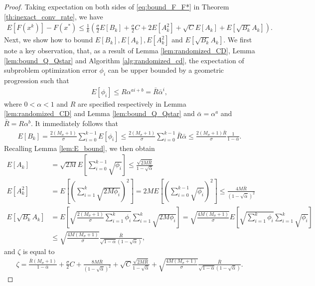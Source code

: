 \documentclass[11pt]{article}
\numberwithin{equation}{section}
\begin{document}
\begin{proof}
    Taking expectation on both sides of \eqref{eq:bound_F_F*} in Theorem \ref{th:inexact_conv_rate}, we have
    \begin{align}
    \label{eq:exp_bound}
        E[F(x^k)] - F(x^*) \leq \frac{1}{k} \left( \frac{\sigma}{2} E[B_k] +\frac{\sigma}{2} C + 2E[A_k^2] + \sqrt{C} E[A_k] + E[\sqrt{B_k} A_k] \right).
    \end{align}
    Next, we show how to bound $E[B_k], E[A_k], E[A_k^2]$ and $E[\sqrt{B_k} A_k]$. We first note a key observation, that, as a result of Lemma \ref{lem:randomized_CD}, Lemma \ref{lem:bound_Q_Qstar} and Algorithm \ref{alg:randomized_cd}, the expectation of subproblem optimization error $\phi_i$ can be upper bounded by a geometric progression such that
    \begin{align*}
        E[\phi_i] \leq R \alpha^{ai+b}=\bar R\bar \alpha^i,
    \end{align*}
    where $0 < \alpha < 1$ and $R$ are specified respectively in Lemma \ref{lem:randomized_CD} and Lemma \ref{lem:bound_Q_Qstar} and $\bar \alpha=\alpha^a$ and $\bar R=R\alpha^b$. It immediately follows that
    \begin{align*}
        E[B_k] = \frac{2(M_{\sigma}+1)}{\sigma} \sum_{i=0}^{k-1} E[\phi_i] \leq \frac{2(M_{\sigma}+1)}{\sigma} \sum_{i=0}^{k-1} \bar R\bar \alpha \leq \frac{2(M_{\sigma}+1)\bar R}{\sigma} \frac{1}{1 -\bar \alpha}.
    \end{align*}
    Recalling Lemma \ref{lem:E_bound}, we then obtain
    \begin{align*}
        E[A_k] &= \sqrt{2M}  E[\sum_{i=0}^{k-1} \sqrt{\phi_i}] \leq \frac{ \sqrt{2M\bar R}}{ 1 - \sqrt{\bar \alpha}} \\
        E[A_k^2] &= E[(\sum_{i=1}^{k} \sqrt{2M\phi_i})^2] = 2M E[(\sum_{i=0}^{k-1} \sqrt{\phi_i})^2] \leq \frac{4M\bar R }{ (1 - \sqrt{\bar \alpha})^2} \\
        E[\sqrt{B_k} A_k] &= E[\sqrt{\frac{2(M_{\sigma}+1)}{\sigma} \sum_{i=1}^{k}\phi_i}\sum_{i=1}^{k} \sqrt{2M\phi_i}] = \sqrt{\frac{4M(M_{\sigma}+1)}{\sigma}} E[\sqrt{\sum_{i=1}^{k}\phi_i}\sum_{i=1}^{k} \sqrt{\phi_i}] \\
        &\leq \sqrt{\frac{4M(M_{\sigma}+1)}{\sigma}} \frac{\bar R  }{ \sqrt{1 - \bar \alpha} (1 - \sqrt{\bar \alpha})},
    \end{align*}
    and $\zeta$ is equal to
    \begin{align*}
        \zeta = \frac{\bar R (M_{\sigma}+1)}{1 - \bar \alpha }  + \frac{\sigma}{2} C + \frac{8M\bar R }{ (1 - \sqrt{\bar \alpha})^2} + \sqrt C \frac{ \sqrt{2M\bar R }}{ 1 - \sqrt{\bar \alpha}} + \sqrt{\frac{4M(M_{\sigma}+1)}{\sigma}} \frac{\bar R }{ \sqrt{1 - \bar \alpha} (1 - \sqrt{\bar \alpha})}.
    \end{align*}
    
    
\end{proof}
    
\end{document}
